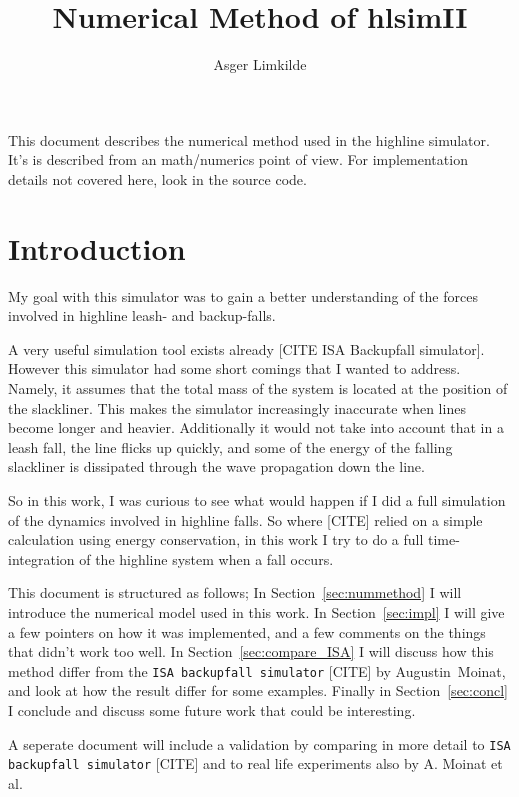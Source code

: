\documentclass[a4paper,10pt]{article}
\title{Numerical Method of hlsimII}
\author{Asger Limkilde}
\begin{document}
\maketitle

This document describes the numerical method used in the highline simulator. It's is described from an math/numerics point of view. For implementation details not covered here, look in the source code.


\tableofcontents

\section{Introduction}
\label{sec:intro}
My goal with this simulator was to gain a better understanding of the forces involved in highline leash- and backup-falls. 

A very useful simulation tool exists already [CITE ISA Backupfall simulator]. However this simulator had some short comings that I wanted to address. Namely, it assumes that the total mass of the system is located at the position of the slackliner. This makes the simulator increasingly inaccurate when lines become longer and heavier. Additionally it would not take into account that in a leash fall, the line flicks up quickly, and some of the energy of the falling slackliner is dissipated through the wave propagation down the line.

So in this work, I was curious to see what would happen if I did a full simulation of the dynamics involved in highline falls. So where [CITE] relied on a simple calculation using energy conservation, in this work I try to do a full time-integration of the highline system when a fall occurs.

This document is structured as follows; In Section~\ref{sec:nummethod} I will introduce the numerical model used in this work. In Section~\ref{sec:impl} I will give a few pointers on how it was implemented, and a few comments on the things that didn't work too well. In Section~\ref{sec:compare_ISA} I will discuss how this method differ from the \texttt{ISA backupfall simulator} [CITE] by Augustin~Moinat, and look at how the result differ for some examples. Finally in Section~\ref{sec:concl} I conclude and discuss some future work that could be interesting.

A seperate document will include a validation by comparing in more detail to \texttt{ISA backupfall simulator} [CITE] and to real life experiments also by A. Moinat et al.
\end{document}
